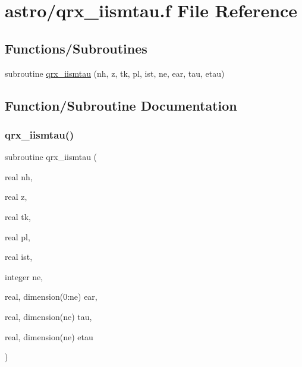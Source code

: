 \hypertarget{qrx__iismtau_8f}{}\section{astro/qrx\+\_\+iismtau.f File Reference}
\label{qrx__iismtau_8f}
\subsection*{Functions/\+Subroutines}
\begin{DoxyCompactItemize}
\item 
subroutine \hyperlink{qrx__iismtau_8f_a96a68278faa62e89c263996e65a51896}{qrx\+\_\+iismtau} (nh, z, tk, pl, ist, ne, ear, tau, etau)
\end{DoxyCompactItemize}


\subsection{Function/\+Subroutine Documentation}
\mbox{\label{qrx__iismtau_8f_a96a68278faa62e89c263996e65a51896}} 
\subsubsection{\texorpdfstring{qrx\+\_\+iismtau()}{qrx\_iismtau()}}
{\footnotesize\ttfamily subroutine qrx\+\_\+iismtau (\begin{DoxyParamCaption}\item[{real}]{nh,  }\item[{real}]{z,  }\item[{real}]{tk,  }\item[{real}]{pl,  }\item[{real}]{ist,  }\item[{integer}]{ne,  }\item[{real, dimension(0\+:ne)}]{ear,  }\item[{real, dimension(ne)}]{tau,  }\item[{real, dimension(ne)}]{etau }\end{DoxyParamCaption})}

